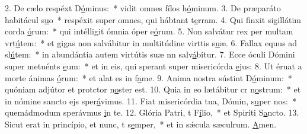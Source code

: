2. De cælo respéxt D\uline{ó}minus:~* vidit omnes fílos h\uline{ó}minum.
3. De præparáto habitácul s\uline{u}o~* respéxit super omnes, qui hábtant t\uline{e}rram.
4. Qui finxit sigillátim corda \uline{ó}rum:~* qui intélligit ómnia óper e\uline{ó}rum.
5. Non salvátur rex per multam vrt\uline{ú}tem:~* et gigas non salvábitur in multitúdine virttis s\uline{u}æ.
6. Fallax equus ad sl\uline{ú}tem:~* in abundántia autem virtútis suæ nn salv\uline{á}bitur.
7. Ecce óculi Dómini super metuénts \uline{e}um:~* et in eis, qui sperant super misericórda \uline{e}jus:
8. Ut éruat a morte ánimas \uline{ó}rum:~* et alat es in f\uline{a}me.
9. Anima nostra sústint D\uline{ó}minum:~* quóniam adjútor et protctor n\uline{o}ster est.
10. Quia in eo lætábitur cr n\uline{o}strum:~* et in nómine sancto ejs sper\uline{á}vimus.
11. Fiat misericórdia tua, Dómin, s\uline{u}per nos:~* quemádmodum sperávmus \uline{i}n te.
12. Glória Patri, t F\uline{í}lio,~* et Spiríti S\uline{a}ncto.
13. Sicut erat in princípio, et nunc, t s\uline{e}mper,~* et in sǽcula sæculrum. \uline{A}men.

